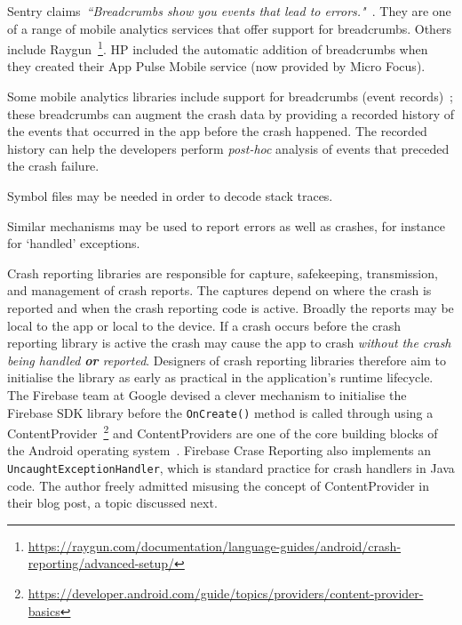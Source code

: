 \label{breadcrumbs-preserve-history}
Sentry claims~\emph{``Breadcrumbs show you events that lead to errors."}~\citep{sentry_features_breadcrumbs}. They are one of a range of mobile analytics services that offer support for breadcrumbs. Others include Raygun~\footnote{\url{https://raygun.com/documentation/language-guides/android/crash-reporting/advanced-setup/}}. HP included the automatic addition of breadcrumbs when they created their App Pulse Mobile service (now provided by Micro Focus).

Some mobile analytics libraries include support for breadcrumbs (event records)~\citep[p.683]{MacLean2015_pro_android_5_book}; these breadcrumbs can augment the crash data by providing a recorded history of the events that occurred in the app before the crash happened. The recorded history can help the developers perform \emph{post-hoc} analysis of events that preceded the crash failure. 

Symbol files may be needed in order to decode stack traces. 

Similar mechanisms may be used to report errors as well as crashes, for instance for `handled' exceptions.

Crash reporting libraries are responsible for capture, safekeeping, transmission, and management of crash reports. The captures depend on where the crash is reported and when the crash reporting code is active. Broadly the reports may be local to the app or local to the device. If a crash occurs before the crash reporting library is active the crash may cause the app to crash \emph{without the crash being handled \textbf{or} reported}. Designers of crash reporting libraries therefore aim to initialise the library as early as practical in the application's runtime lifecycle. The Firebase team at Google devised a clever mechanism to initialise the Firebase SDK library before the \texttt{OnCreate()} method is called through using a ContentProvider~\footnote{\url{https://developer.android.com/guide/topics/providers/content-provider-basics}} and ContentProviders are one of the core building blocks of the Android operating system~\citep{firebaseblog2016_how_does_firebase_initialize_on_android}. Firebase Crase Reporting also implements an \texttt{UncaughtExceptionHandler}, which is standard practice for crash handlers in Java code. The author freely admitted misusing the concept of ContentProvider in their blog post, a topic discussed next.

